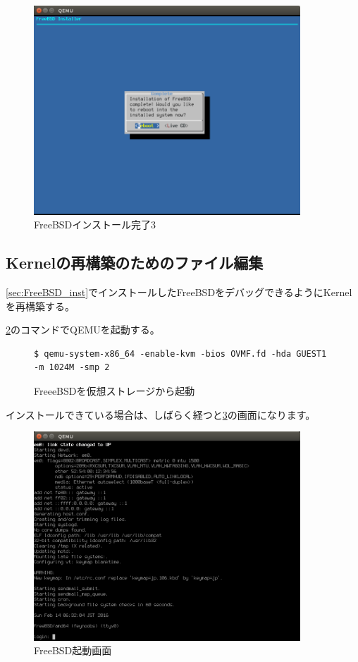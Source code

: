 \documentclass[a4j]{jarticle}
\begin{document}
\begin{figure}[htbp]
	\begin{center}
    	\includegraphics[width=10cm]{./IMG/FreeBSD_ALL_LAS.png}
	\end{center}
    \caption{FreeBSDインストール完了3}
    \label{fig:FreeBSD_FIN_3}
\end{figure}


\subsection{Kernelの再構築のためのファイル編集}
\ref{sec:FreeBSD_inst}でインストールしたFreeBSDをデバッグできるようにKernelを再構築する。

\ref{fig:FreeBSD_boot_com}のコマンドでQEMUを起動する。
\begin{figure}[htbp]
	\begin{center}
		\begin{lstlisting}[basicstyle=\ttfamily\footnotesize, frame=single, breaklines=true]
$ qemu-system-x86_64 -enable-kvm -bios OVMF.fd -hda GUEST1 -m 1024M -smp 2
	    \end{lstlisting}
	\end{center}
	\caption{FreeeBSDを仮想ストレージから起動}
	\label{fig:FreeBSD_boot_com}
\end{figure}

インストールできている場合は、しばらく経つと\ref{fig:FreeBSD_BOOT}の画面になります。
\begin{figure}[htbp]
	\begin{center}
    	\includegraphics[width=10cm]{./IMG/FreeBSD_BOOT.png}
	\end{center}
    \caption{FreeBSD起動画面}
    \label{fig:FreeBSD_BOOT}
\end{figure}
\end{document}
